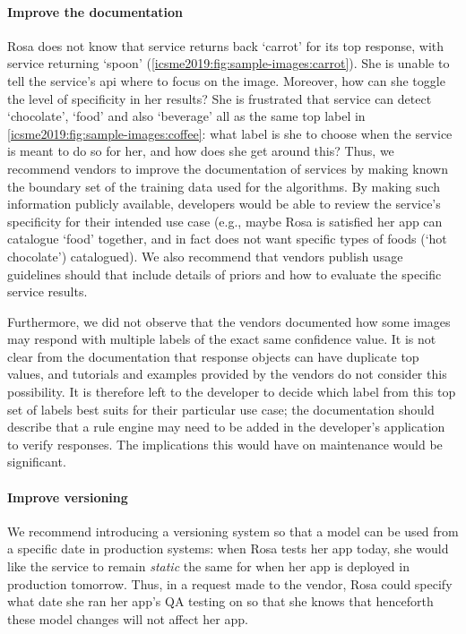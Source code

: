 \paragraph{Improve the documentation}
Rosa does not know that service \googleapi{} returns back `carrot' for its top response, with service \awsapi{} returning `spoon' (\cref{icsme2019:fig:sample-images:carrot}). She is unable to tell the service's \gls{api} where to focus on the image. Moreover, how can she toggle the level of specificity in her results? She is frustrated that service \awsapi{} can detect `chocolate', `food' and also `beverage' all as the same top label in \cref{icsme2019:fig:sample-images:coffee}: what label is she to choose when the service is meant to do so for her, and how does she get around this? Thus, we recommend vendors to improve the documentation of services by making known the boundary set of the training data used for the algorithms. By making such information publicly available, developers would be able to review the service's specificity for their intended use case (e.g., maybe Rosa is satisfied her app can catalogue `food' together, and in fact does not want specific types of foods (`hot chocolate') catalogued). We also recommend that vendors publish usage guidelines should that include details of priors and how to evaluate the specific service results.

Furthermore, we did not observe that the vendors documented how some images may respond with multiple labels of the exact same confidence value. It is not clear from the documentation that response objects can have duplicate top values, and tutorials and examples provided by the vendors do not consider this possibility. It is therefore left to the developer to decide which label from this top set of labels best suits for their particular use case; the documentation should describe that a rule engine may need to be added in the developer's application to verify responses. The implications this would have on maintenance would be significant.

\paragraph{Improve versioning}
We recommend introducing a versioning system so that a model can be used from a specific date in production systems: when Rosa tests her app today, she would like the service to remain \textit{static} the same for when her app is deployed in production tomorrow. Thus, in a request made to the vendor, Rosa could specify what date she ran her app's QA testing on so that she knows that henceforth these model changes will not affect her app.

